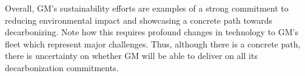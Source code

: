 Overall, GM's sustainability efforts are examples of a strong commitment to reducing environmental impact and showcasing a concrete path towards decarbonizing. Note how this requires profound changes in technology to GM's fleet which represent major challenges. Thus, although there is a concrete path, there is uncertainty on whether GM will be able to deliver on all its decarbonization commitments. 






